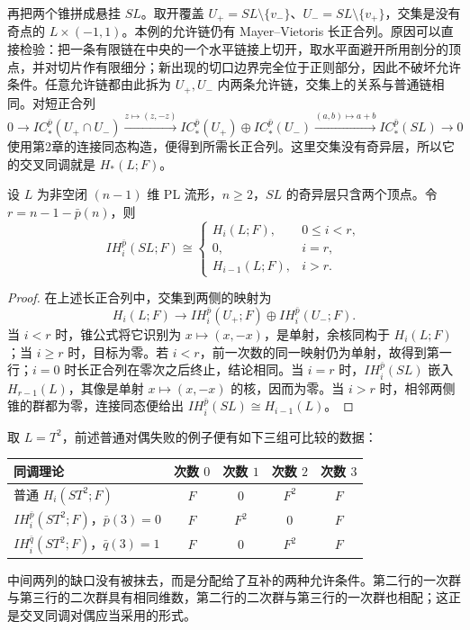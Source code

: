 再把两个锥拼成悬挂 \(SL\)。取开覆盖 \(U_+=SL\setminus\{v_-\}\)、\(U_-=SL\setminus\{v_+\}\)，交集是没有奇点的 \(L\times(-1,1)\)。本例的允许链仍有 Mayer--Vietoris 长正合列。原因可以直接检验：把一条有限链在中央的一个水平链接上切开，取水平面避开所用剖分的顶点，并对切片作有限细分；新出现的切口边界完全位于正则部分，因此不破坏允许条件。任意允许链都由此拆为 \(U_+,U_-\) 内两条允许链，交集上的关系与普通链相同。对短正合列
\[
	0\longrightarrow IC_*^{\bar p}(U_+\cap U_-)
	\xrightarrow{z\mapsto(z,-z)}IC_*^{\bar p}(U_+)\oplus IC_*^{\bar p}(U_-)
	\xrightarrow{(a,b)\mapsto a+b}IC_*^{\bar p}(SL)\longrightarrow0
\]
使用第2章的连接同态构造，便得到所需长正合列。这里交集没有奇异层，所以它的交叉同调就是 \(H_*(L;F)\)。

\begin{proposition}\label{g2:prop:intersection-suspension}
	设 \(L\) 为非空闭 \((n-1)\) 维 PL 流形，\(n\ge2\)，\(SL\) 的奇异层只含两个顶点。令 \(r=n-1-\bar p(n)\)，则
	\begin{equation}\label{g2:eq:intersection-suspension}
		IH_i^{\bar p}(SL;F)\cong
		\begin{cases}
			H_i(L;F),&0\le i<r,\\
			0,&i=r,\\
			H_{i-1}(L;F),&i>r.
		\end{cases}
	\end{equation}
\end{proposition}
\begin{proof}
	在上述长正合列中，交集到两侧的映射为
	\[
		H_i(L;F)\longrightarrow IH_i^{\bar p}(U_+;F)\oplus IH_i^{\bar p}(U_-;F).
	\]
	当 \(i<r\) 时，锥公式将它识别为 \(x\mapsto(x,-x)\)，是单射，余核同构于 \(H_i(L;F)\)；当 \(i\ge r\) 时，目标为零。若 \(i<r\)，前一次数的同一映射仍为单射，故得到第一行；\(i=0\) 时长正合列在零次之后终止，结论相同。当 \(i=r\) 时，\(IH_i^{\bar p}(SL)\) 嵌入 \(H_{r-1}(L)\)，其像是单射 \(x\mapsto(x,-x)\) 的核，因而为零。当 \(i>r\) 时，相邻两侧锥的群都为零，连接同态便给出 \(IH_i^{\bar p}(SL)\cong H_{i-1}(L)\)。
\end{proof}

取 \(L=T^2\)，前述普通对偶失败的例子便有如下三组可比较的数据：
\begin{center}
	\begin{tabular}{@{}l c c c c@{}}
		\toprule
		同调理论 & 次数 \(0\) & 次数 \(1\) & 次数 \(2\) & 次数 \(3\) \\
		\midrule
		普通 \(H_i(ST^2;F)\) & \(F\) & \(0\) & \(F^2\) & \(F\) \\
		\(IH_i^{\bar p}(ST^2;F)\)，\(\bar p(3)=0\) & \(F\) & \(F^2\) & \(0\) & \(F\) \\
		\(IH_i^{\bar q}(ST^2;F)\)，\(\bar q(3)=1\) & \(F\) & \(0\) & \(F^2\) & \(F\) \\
		\bottomrule
	\end{tabular}
\end{center}
中间两列的缺口没有被抹去，而是分配给了互补的两种允许条件。第二行的一次群与第三行的二次群具有相同维数，第二行的二次群与第三行的一次群也相配；这正是交叉同调对偶应当采用的形式。

